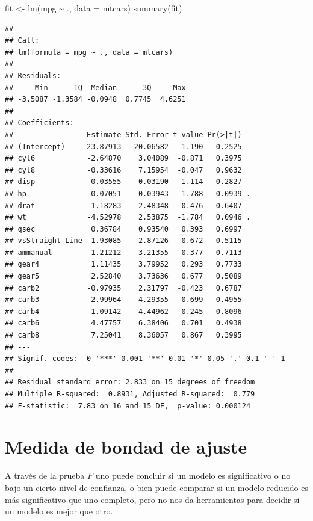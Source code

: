 \documentclass[
  12pt,
]{book}
\newenvironment{Shaded}{\begin{snugshade}}{\end{snugshade}}
\newcommand{\AttributeTok}[1]{\textcolor[rgb]{0.77,0.63,0.00}{#1}}
\newcommand{\FunctionTok}[1]{\textcolor[rgb]{0.00,0.00,0.00}{#1}}
\newcommand{\NormalTok}[1]{#1}
\newcommand{\OtherTok}[1]{\textcolor[rgb]{0.56,0.35,0.01}{#1}}
\newcommand{\SpecialCharTok}[1]{\textcolor[rgb]{0.00,0.00,0.00}{#1}}
\begin{document}
\begin{Shaded}
\begin{Highlighting}[]
\NormalTok{fit }\OtherTok{\textless{}{-}} \FunctionTok{lm}\NormalTok{(mpg }\SpecialCharTok{\textasciitilde{}}\NormalTok{ ., }\AttributeTok{data =}\NormalTok{ mtcars)}
\FunctionTok{summary}\NormalTok{(fit)}
\end{Highlighting}
\end{Shaded}

\begin{verbatim}
## 
## Call:
## lm(formula = mpg ~ ., data = mtcars)
## 
## Residuals:
##     Min      1Q  Median      3Q     Max 
## -3.5087 -1.3584 -0.0948  0.7745  4.6251 
## 
## Coefficients:
##                 Estimate Std. Error t value Pr(>|t|)  
## (Intercept)     23.87913   20.06582   1.190   0.2525  
## cyl6            -2.64870    3.04089  -0.871   0.3975  
## cyl8            -0.33616    7.15954  -0.047   0.9632  
## disp             0.03555    0.03190   1.114   0.2827  
## hp              -0.07051    0.03943  -1.788   0.0939 .
## drat             1.18283    2.48348   0.476   0.6407  
## wt              -4.52978    2.53875  -1.784   0.0946 .
## qsec             0.36784    0.93540   0.393   0.6997  
## vsStraight-Line  1.93085    2.87126   0.672   0.5115  
## ammanual         1.21212    3.21355   0.377   0.7113  
## gear4            1.11435    3.79952   0.293   0.7733  
## gear5            2.52840    3.73636   0.677   0.5089  
## carb2           -0.97935    2.31797  -0.423   0.6787  
## carb3            2.99964    4.29355   0.699   0.4955  
## carb4            1.09142    4.44962   0.245   0.8096  
## carb6            4.47757    6.38406   0.701   0.4938  
## carb8            7.25041    8.36057   0.867   0.3995  
## ---
## Signif. codes:  0 '***' 0.001 '**' 0.01 '*' 0.05 '.' 0.1 ' ' 1
## 
## Residual standard error: 2.833 on 15 degrees of freedom
## Multiple R-squared:  0.8931, Adjusted R-squared:  0.779 
## F-statistic:  7.83 on 16 and 15 DF,  p-value: 0.000124
\end{verbatim}

\hypertarget{medida-de-bondad-de-ajuste}{%
\section{Medida de bondad de ajuste}\label{medida-de-bondad-de-ajuste}}

A través de la prueba \(F\) uno puede concluir si un modelo es
significativo o no bajo un cierto nivel de confianza, o bien puede
comparar si un modelo reducido es más significativo que uno completo,
pero no nos da herramientas para decidir si un modelo es mejor que otro.
\end{document}
